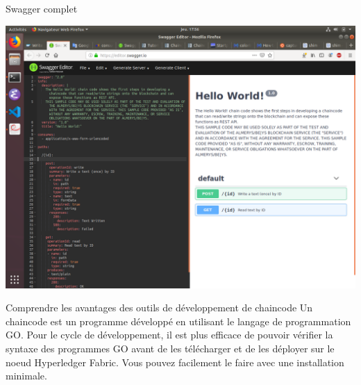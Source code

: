 \documentclass[presentation]{beamer}
\begin{document}
\begin{frame}[label={sec:org41d2ead}]{Swagger complet}
\begin{center}
\includegraphics[width=.9\linewidth]{./swagger_complete.png}
\end{center}
\end{frame}
\begin{frame}[label={sec:orgdd4c4cd}]{Comprendre les avantages des outils de développement de chaincode}
Un chaincode est un programme développé en utilisant le langage de 
programmation GO. Pour le cycle de développement, il est plus efficace
de pouvoir vérifier la syntaxe des programmes GO avant de les télécharger
et de les déployer sur le noeud Hyperledger Fabric. Vous pouvez facilement
le faire avec une installation minimale.
\end{frame}
\end{document}
